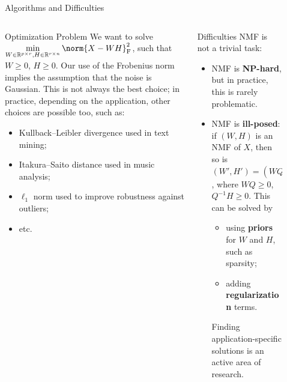 \documentclass[final]{beamer}
\newlength{\sepwid}
\newlength{\onecolwid}
\newlength{\threecolwid}
\begin{document}
\begin{frame}
\begin{columns}[t]
\begin{column}{\threecolwid}
\begin{exampleblock}{Algorithms and Difficulties}
\begin{columns}[t]
\begin{column}{\onecolwid}
\begin{block}{Optimization Problem}
We want to solve \(\displaystyle \min_{W \in \mathbb{R}^{p \times r}, H \in \mathbb{R}^{r \times n}} \norm{X - WH}^2_{\textnormal{F}}\), such that \(W \geqslant 0\), \(H \geqslant 0\).
Our use of the Frobenius norm implies the assumption that the noise is Gaussian.
This is not always the best choice; in practice, depending on the application, other choices are possible too, such as:
\begin{itemize}
    \item Kullback--Leibler divergence used in text mining;
    \item Itakura--Saito distance used in music analysis;
    \item \(\ell_1\) norm used to improve robustness against outliers;
    \item etc.
\end{itemize}
\end{block}
\end{column}
\begin{column}{\onecolwid}
\begin{block}{Difficulties}
NMF is not a trivial task:
\begin{itemize}
    \item NMF is \textbf{NP-hard}, but in practice, this is rarely problematic.
    \item NMF is \textbf{ill-posed}: if \((W, H)\) is an NMF of \(X\), then so is \((W', H') = (WQ, Q^{-1}H)\), where \(WQ \geqslant 0\), \(Q^{-1}H \geqslant 0\).
    This can be solved by
    \begin{itemize}
        \item using \textbf{priors} for \(W\) and \(H\), such as sparsity;
        \item adding \textbf{regularization} terms.
    \end{itemize}
    Finding application-specific solutions is an active area of research.
\end{itemize}
\end{block}
\end{column}
\end{columns}
\end{exampleblock}

\end{column}
\begin{column}{\sepwid}
\end{column} %
\begin{column}{\onecolwid}
\begin{columns}[t]
\begin{column}{\onecolwid} %



\end{column}
\end{columns}
\end{column}
\end{columns}
\end{frame}
\end{document}
